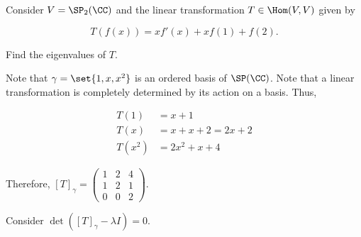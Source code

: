 \documentclass[11pt]{scrartcl}
\begin{document}
\begin{linenumbers}
  Consider $V = \SP_2(\CC)$ and the linear transformation $T\in \Hom(V,V)$ given by

  \begin{equation*}
    T(f(x)) = xf'(x) + xf(1) + f(2).
  \end{equation*}

  \begin{problem*}
    Find the eigenvalues of $T$.
  \end{problem*}
  \begin{soln}
    Note that $\gamma = \set{1, x, x^{2}}$ is an ordered basis of
    $\SP(\CC)$. Note that a linear transformation is completely
    determined by its action on a basis. Thus,

    \begin{align}
      T(1)   & = x + 1               \\
      T(x)   & = x + x + 2 =  2x + 2 \\
      T(x^2) & = 2x^2 + x + 4
    \end{align}

    Therefore, $[T]_{\gamma} =
    \begin{pmatrix}
      1 & 2 & 4 \\
      1 & 2 & 1 \\
      0 & 0 & 2
    \end{pmatrix}
    $.

    Consider $\det([T]_{\gamma}-\lambda I) = 0$.



\end{soln}
\end{linenumbers}
\end{document}

